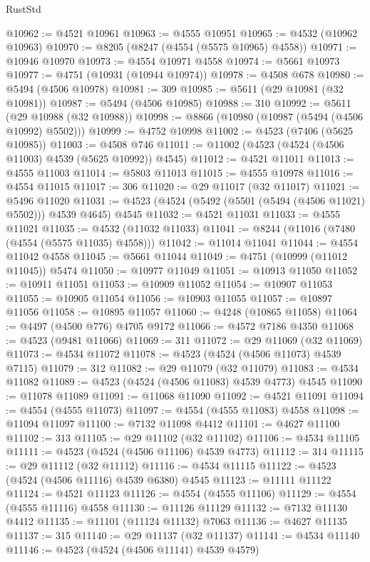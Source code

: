 \begin{lexlean}{RustStd}
\begin{coremodule}
@10962 := @4521 @10961
@10963 := @4555 @10951
@10965 := @4532 (@10962 @10963)
@10970 := @8205 (@8247 (@4554 (@5575 @10965) @4558))
@10971 := @10946 @10970
@10973 := @4554 @10971 @4558
@10974 := @5661 @10973
@10977 := @4751 (@10931 (@10944 @10974))
@10978 := @4508 @678
@10980 := @5494 (@4506 @10978)
@10981 := 309
@10985 := @5611 (@29 @10981 (@32 @10981))
@10987 := @5494 (@4506 @10985)
@10988 := 310
@10992 := @5611 (@29 @10988 (@32 @10988))
@10998 := @8866 (@10980 (@10987 (@5494 (@4506 @10992) @5502)))
@10999 := @4752 @10998
@11002 := @4523 (@7406 (@5625 @10985))
@11003 := @4508 @746
@11011 := @11002 (@4523 (@4524 (@4506 @11003) @4539 (@5625 @10992)) @4545)
@11012 := @4521 @11011
@11013 := @4555 @11003
@11014 := @5803 @11013
@11015 := @4555 @10978
@11016 := @4554 @11015
@11017 := 306
@11020 := @29 @11017 (@32 @11017)
@11021 := @5496 @11020
@11031 := @4523 (@4524 (@5492 (@5501 (@5494 (@4506 @11021) @5502))) @4539 @4645) @4545
@11032 := @4521 @11031
@11033 := @4555 @11021
@11035 := @4532 (@11032 @11033)
@11041 := @8244 (@11016 (@7480 (@4554 (@5575 @11035) @4558)))
@11042 := @11014 @11041
@11044 := @4554 @11042 @4558
@11045 := @5661 @11044
@11049 := @4751 (@10999 (@11012 @11045)) @5474
@11050 := @10977 @11049
@11051 := @10913 @11050
@11052 := @10911 @11051
@11053 := @10909 @11052
@11054 := @10907 @11053
@11055 := @10905 @11054
@11056 := @10903 @11055
@11057 := @10897 @11056
@11058 := @10895 @11057
@11060 := @4248 (@10865 @11058)
@11064 := @4497 (@4500 @776) @4705 @9172
@11066 := @4572 @7186 @4350
@11068 := @4523 (@9481 @11066)
@11069 := 311
@11072 := @29 @11069 (@32 @11069)
@11073 := @4534 @11072
@11078 := @4523 (@4524 (@4506 @11073) @4539 @7115)
@11079 := 312
@11082 := @29 @11079 (@32 @11079)
@11083 := @4534 @11082
@11089 := @4523 (@4524 (@4506 @11083) @4539 @4773) @4545
@11090 := @11078 @11089
@11091 := @11068 @11090
@11092 := @4521 @11091
@11094 := @4554 (@4555 @11073)
@11097 := @4554 (@4555 @11083) @4558
@11098 := @11094 @11097
@11100 := @7132 @11098 @4412
@11101 := @4627 @11100
@11102 := 313
@11105 := @29 @11102 (@32 @11102)
@11106 := @4534 @11105
@11111 := @4523 (@4524 (@4506 @11106) @4539 @4773)
@11112 := 314
@11115 := @29 @11112 (@32 @11112)
@11116 := @4534 @11115
@11122 := @4523 (@4524 (@4506 @11116) @4539 @6380) @4545
@11123 := @11111 @11122
@11124 := @4521 @11123
@11126 := @4554 (@4555 @11106)
@11129 := @4554 (@4555 @11116) @4558
@11130 := @11126 @11129
@11132 := @7132 @11130 @4412
@11135 := @11101 (@11124 @11132) @7063
@11136 := @4627 @11135
@11137 := 315
@11140 := @29 @11137 (@32 @11137)
@11141 := @4534 @11140
@11146 := @4523 (@4524 (@4506 @11141) @4539 @4579)

\end{coremodule}
\end{lexlean}

